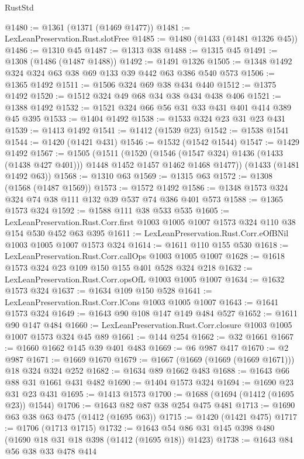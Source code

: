 \begin{lexlean}{RustStd}
\begin{coremodule}
@1480 := @1361 (@1371 (@1469 @1477))
@1481 := LexLeanPreservation.Rust.slotFree
@1485 := @1480 (@1433 (@1481 @1326 @45))
@1486 := @1310 @45
@1487 := @1313 @38
@1488 := @1315 @45
@1491 := @1308 (@1486 (@1487 @1488))
@1492 := @1491 @1326
@1505 := @1348 @1492 @324 @324 @63 @38 @69 @133 @39 @442 @63 @386 @540 @573
@1506 := @1365 @1492
@1511 := @1506 @324 @69 @38 @434 @440
@1512 := @1375 @1492
@1520 := @1512 @324 @49 @68 @34 @38 @434 @438 @406
@1521 := @1388 @1492
@1532 := @1521 @324 @66 @56 @31 @33 @431 @401 @414 @389 @45 @395
@1533 := @1404 @1492
@1538 := @1533 @324 @23 @31 @23 @431
@1539 := @1413 @1492
@1541 := @1412 (@1539 @23)
@1542 := @1538 @1541
@1544 := @1420 (@1421 @431)
@1546 := @1532 (@1542 @1544)
@1547 := @1429 @1492
@1567 := @1505
    (@1511
      (@1520
        (@1546 (@1547 @324) @1436 (@1433 (@1438 @427 @401)))
        @1448
        @1452
        @1457
        @1462
        @1468
        @1477))
    (@1433 (@1481 @1492 @63))
@1568 := @1310 @63
@1569 := @1315 @63
@1572 := @1308 (@1568 (@1487 @1569))
@1573 := @1572 @1492
@1586 := @1348 @1573 @324 @324 @74 @38 @111 @132 @39 @537 @74 @386 @401 @573
@1588 := @1365 @1573 @324
@1592 := @1588 @111 @38 @533 @535
@1605 := LexLeanPreservation.Rust.Corr.first
    @1003
    @1005
    @1007
    @1573
    @324
    @110
    @38
    @154
    @530
    @452
    @63
    @395
@1611 := LexLeanPreservation.Rust.Corr.eOfBNil @1003 @1005 @1007 @1573 @324
@1614 := @1611 @110 @155 @530
@1618 := LexLeanPreservation.Rust.Corr.callOps @1003 @1005 @1007
@1628 := @1618 @1573 @324 @23 @109 @150 @155 @401 @528 @324 @218
@1632 := LexLeanPreservation.Rust.Corr.opsOfL @1003 @1005 @1007
@1634 := @1632 @1573 @324
@1637 := @1634 @109 @150 @528
@1641 := LexLeanPreservation.Rust.Corr.lCons @1003 @1005 @1007
@1643 := @1641 @1573 @324
@1649 := @1643 @90 @108 @147 @149 @484 @527
@1652 := @1611 @90 @147 @484
@1660 := LexLeanPreservation.Rust.Corr.closure @1003 @1005 @1007 @1573 @324 @45 @89
@1661 := @144 @254
@1662 := @32 @1661
@1667 := @1660 @1662 @145 @39 @401 @483
@1669 := @6 @987 @417
@1670 := @2 @987
@1671 := @1669 @1670
@1679 := @1667 (@1669 (@1669 (@1669 @1671))) @18 @324 @324 @252
@1682 := @1634 @89 @1662 @483
@1688 := @1643 @66 @88 @31 @1661 @431 @482
@1690 := @1404 @1573 @324
@1694 := @1690 @23 @31 @23 @431
@1695 := @1413 @1573
@1700 := @1688 (@1694 (@1412 (@1695 @23)) @1544)
@1706 := @1643 @82 @87 @38 @254 @475 @481
@1713 := @1690 @63 @38 @63 @475 (@1412 (@1695 @63))
@1715 := @1420 (@1421 @475)
@1717 := @1706 (@1713 @1715)
@1732 := @1643 @54 @86 @31 @145 @398 @480 (@1690 @18 @31 @18 @398 (@1412 (@1695 @18)) @1423)
@1738 := @1643 @84 @56 @38 @33 @478 @414

\end{coremodule}
\end{lexlean}
